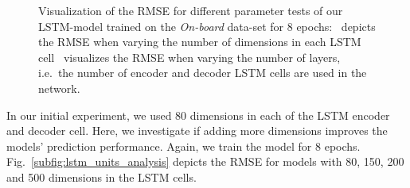 \begin{figure}[t!]
	\centering
    \vspace{-0.3cm}
    \caption{Visualization of the \ac{RMSE} for different parameter tests of our \ac{LSTM}-model trained on the \emph{On-board} data-set for \num{8} epochs:~\protect{} depicts the \ac{RMSE} when varying the number of dimensions in each \ac{LSTM} cell~\protect{} visualizes the \ac{RMSE} when varying the number of layers, i.e.\ the number of encoder and decoder \ac{LSTM} cells are used in the network.}
    \label{fig:lstm_units_layers_analysis}
\end{figure}
In our initial experiment, we used \num{80} dimensions in each of the \ac{LSTM} encoder and decoder cell.
Here, we investigate if adding more dimensions improves the models' prediction performance.
Again, we train the model for \num{8} epochs.
Fig.~\ref{subfig:lstm_units_analysis} depicts the \ac{RMSE} for models with \num{80}, \num{150}, \num{200} and \num{500} dimensions in the \ac{LSTM} cells.
